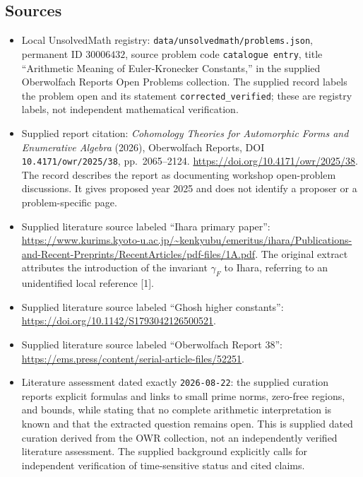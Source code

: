 \documentclass[11pt]{article}
\begin{document}
\subsection{Sources}
\begin{itemize}
\item Local UnsolvedMath registry: \texttt{data/unsolvedmath/problems.json}, permanent ID \(30006432\), source problem code \texttt{catalogue entry}, title ``Arithmetic Meaning of Euler-Kronecker Constants,'' in the supplied Oberwolfach Reports Open Problems collection. The supplied record labels the problem open and its statement \texttt{corrected\_verified}; these are registry labels, not independent mathematical verification.
\item Supplied report citation: \emph{Cohomology Theories for Automorphic Forms and Enumerative Algebra} (2026), Oberwolfach Reports, DOI \texttt{10.4171/owr/2025/38}, pp.\ 2065--2124. \url{https://doi.org/10.4171/owr/2025/38}. The record describes the report as documenting workshop open-problem discussions. It gives proposed year 2025 and does not identify a proposer or a problem-specific page.
\item Supplied literature source labeled ``Ihara primary paper'': \url{https://www.kurims.kyoto-u.ac.jp/~kenkyubu/emeritus/ihara/Publications-and-Recent-Preprints/RecentArticles/pdf-files/1A.pdf}. The original extract attributes the introduction of the invariant \(\gamma_F\) to Ihara, referring to an unidentified local reference [1].
\item Supplied literature source labeled ``Ghosh higher constants'': \url{https://doi.org/10.1142/S1793042126500521}.
\item Supplied literature source labeled ``Oberwolfach Report 38'': \url{https://ems.press/content/serial-article-files/52251}.
\item Literature assessment dated exactly \texttt{2026-08-22}: the supplied curation reports explicit formulas and links to small prime norms, zero-free regions, and bounds, while stating that no complete arithmetic interpretation is known and that the extracted question remains open. This is supplied dated curation derived from the OWR collection, not an independently verified literature assessment. The supplied background explicitly calls for independent verification of time-sensitive status and cited claims.
\end{itemize}
\end{document}
